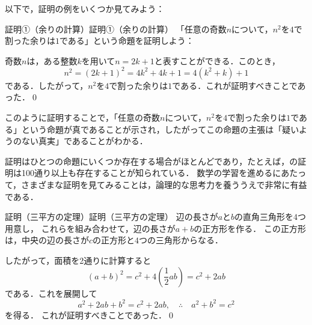 以下で，証明の例をいくつか見てみよう：


\begin{example}{証明①（余りの計算）}{証明①（余りの計算）}
  「任意の奇数$n$について，$n^2$を$4$で割った余りは$1$である」という命題を証明しよう：

  奇数$n$は，ある整数$k$を用いて$n = 2k + 1$と表すことができる．このとき，
\[
  n^2 = (2k + 1)^2 = 4k^2 + 4k + 1 = 4(k^2 + k) + 1
\]
である．したがって，$n^2$を$4$で割った余りは$1$である．これが証明すべきことであった．\qed
\end{example}

このように証明することで，「任意の奇数$n$について，$n^2$を$4$で割った余りは$1$である」という命題が真であることが示され，したがってこの命題の主張は「疑いようのない真実」であることがわかる．

証明はひとつの命題にいくつか存在する場合がほとんどであり，たとえば，の証明は100通り以上も存在することが知られている．
数学の学習を進めるにあたって，さまざまな証明を見てみることは，論理的な思考力を養ううえで非常に有益である．

\begin{example}[
    sidebyside,
    lefthand width=8.5cm,
    righthand width=5cm,
    sidebyside gap=4mm,
  ]{証明（三平方の定理）}{証明（三平方の定理）}
  辺の長さが$a$と$b$の直角三角形を$4$つ用意し，
  これらを組み合わせて，辺の長さが$a + b$の正方形を作る．
  この正方形は，中央の辺の長さが$c$の正方形と$4$つの三角形からなる．

  したがって，面積を2通りに計算すると
  \[
    (a + b)^2
    = c^2 + 4\left(\frac{1}{2}ab\right)
    = c^2 + 2ab
  \]
  である．これを展開して
  \[
    a^2 + 2ab + b^2 = c^2 + 2ab,
    \quad \therefore\quad a^2 + b^2 = c^2
  \]
  を得る．
  これが証明すべきことであった．\qed

  \tcblower

  \centering
\end{example}


